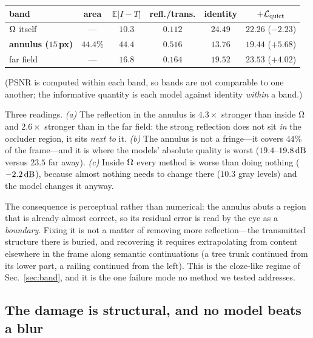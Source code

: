 \begin{center}
\small
\setlength{\tabcolsep}{3pt}
\begin{tabular}{@{}lccccc@{}}
\toprule
band & area & $\mathbb{E}|I-T|$ & refl./trans. & identity & $+\mathcal{L}_{\mathrm{quiet}}$ \\
\midrule
$\Omega$ itself        & ---    & $\mathbf{10.3}$ & $0.112$ & $24.49$ & $22.26$ ($-2.23$) \\
\textbf{annulus ($15$\,px)} & $44.4\%$ & $\mathbf{44.4}$ & $\mathbf{0.516}$ & $13.76$ & $19.44$ ($\mathbf{+5.68}$) \\
far field           & ---    & $16.8$ & $0.164$ & $19.52$ & $23.53$ ($+4.02$) \\
\bottomrule
\end{tabular}
\end{center}

(PSNR is computed within each band, so bands are not comparable to one another; the informative
quantity is each model against identity \emph{within} a band.)

Three readings. \emph{(a)} The reflection in the annulus is $4.3\times$ stronger than inside $\Omega$
and $2.6\times$ stronger than in the far field: the strong reflection does not sit \emph{in} the
occluder region, it sits \emph{next to} it. \emph{(b)} The annulus is not a fringe---it covers
$44\%$ of the frame---and it is where the models' absolute quality is worst ($19.4$--$19.8\,\mathrm{dB}$
versus $23.5$ far away). \emph{(c)} Inside $\Omega$ every method is worse than doing nothing
($-2.2\,\mathrm{dB}$), because almost nothing needs to change there ($10.3$ gray levels) and the model
changes it anyway.

The consequence is perceptual rather than numerical: the annulus abuts a region that is already
almost correct, so its residual error is read by the eye as a \emph{boundary}. Fixing it is not a
matter of removing more reflection---the transmitted structure there is buried, and recovering it
requires extrapolating from content elsewhere in the frame along semantic continuations (a tree
trunk continued from its lower part, a railing continued from the left). This is the cloze-like
regime of Sec.~\ref{sec:band}, and it is the one failure mode no method we tested addresses.

\subsection{The damage is structural, and no model beats a blur}
\label{sec:structural}
\label{sec:ceiling}

